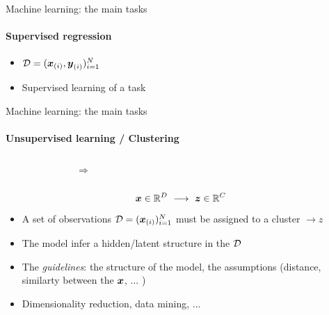 \begin{frame}{Machine learning: the main tasks}
  \framesubtitle{Supervised regression}
  \begin{center}
  \end{center}

  \begin{itemize}
  \item $\mathcal{D}= (\boldsymbol{x}_{(i)}, {\boldsymbol{y}}_{(i)})_{i=1}^{N}$ 
  \item Supervised learning of a  task
  \end{itemize}
\end{frame}



\begin{frame}{Machine learning: the main tasks}
  \framesubtitle{Unsupervised learning / Clustering}
  \begin{columns}
    \begin{figure}[htb]
      \centerline{
      }
    \end{figure}
    \begin{Huge}
    $\Longrightarrow$
    \end{Huge}
    \begin{figure}[htb]
      \centerline{
      }
    \end{figure}
  \end{columns}
  $$ \boldsymbol{x} \in \mathbb{R}^{D} \ \longrightarrow \ \boldsymbol{z} \in \mathbb{R}^{C}$$
  \begin{itemize}
  \item A set of observations $\mathcal{D}= (\boldsymbol{x}_{(i)})_{i=1}^{N}$ must be assigned to a cluster $\rightarrow z$
  \item The model infer a hidden/latent structure in the $\mathcal{D}$ 
  \item The \textit{guidelines}: the structure of the model, the assumptions (distance, similarty between the $\boldsymbol{x}$, ... )
  \item Dimensionality reduction, data mining, ... 
  \end{itemize}
\end{frame}

